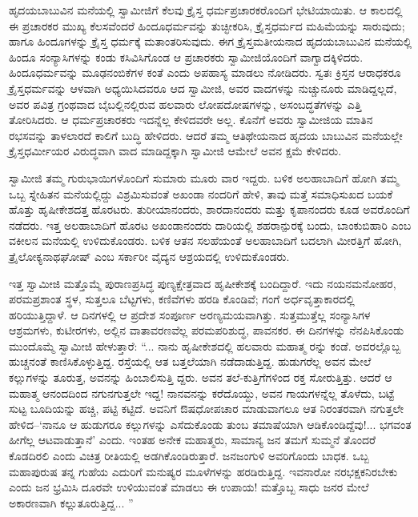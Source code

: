 ಹೃದಯಬಾಬುವಿನ ಮನೆಯಲ್ಲಿ ಸ್ವಾಮೀಜಿಗೆ ಕೆಲವು ಕ್ರೈಸ್ತ ಧರ್ಮಪ್ರಚಾರಕರೊಂದಿಗೆ ಭೇಟಿಯಾಯಿತು. ಆ ಕಾಲದಲ್ಲಿ ಈ ಪ್ರಚಾರಕರ ಮುಖ್ಯ ಕೆಲಸವೆಂದರೆ ಹಿಂದೂಧರ್ಮವನ್ನು ತುಚ್ಛೀಕರಿಸಿ, ಕ್ರೈಸ್ತಧರ್ಮದ ಮಹಿಮೆಯನ್ನು ಸಾರುವುದು; ಹಾಗೂ ಹಿಂದೂಗಳನ್ನು ಕ್ರೈಸ್ತ ಧರ್ಮಕ್ಕೆ ಮತಾಂತರಿಸುವುದು. ಈಗ ಕ್ರೈಸ್ತಮತೀಯನಾದ ಹೃದಯಬಾಬುವಿನ ಮನೆಯಲ್ಲಿ ಹಿಂದೂ ಸಂನ್ಯಾಸಿಗಳನ್ನು ಕಂಡು ಕಸಿವಿಸಿಗೊಂಡ ಆ ಪ್ರಚಾರಕರು ಸ್ವಾಮೀಜಿಯೊಂದಿಗೆ ವಾಗ್ವಾದಕ್ಕಿಳಿದರು. ಹಿಂದೂಧರ್ಮವನ್ನು ಮೂಢನಂಬಿಕೆಗಳ ಕಂತೆ ಎಂದು ಅಪಹಾಸ್ಯ ಮಾಡಲು ನೋಡಿದರು. ಸ್ವತಃ ಕ್ರಿಸ್ತನ ಆರಾಧಕರೂ ಕ್ರೈಸ್ತಧರ್ಮವನ್ನು ಆಳವಾಗಿ ಅಧ್ಯಯಿಸಿದವರೂ ಆದ ಸ್ವಾಮೀಜಿ, ಅವರ ವಾದಗಳನ್ನು ನುಚ್ಚುನೂರು ಮಾಡಿದ್ದಲ್ಲದೆ, ಅವರ ಪವಿತ್ರ ಗ್ರಂಥವಾದ ಬೈಬಲ್ಲಿನಲ್ಲಿರುವ ಹಲವಾರು ಲೋಪದೋಷಗಳನ್ನು, ಅಸಂಬದ್ಧತೆಗಳನ್ನು ಎತ್ತಿ ತೋರಿಸಿದರು. ಆ ಧರ್ಮಪ್ರಚಾರಕರು ಇದನ್ನೆಲ್ಲ ಕೇಳಿದವರೇ ಅಲ್ಲ. ಕೊನೆಗೆ ಅವರು ಸ್ವಾಮೀಜಿಯ ಮಾತಿನ ರಭಸವನ್ನು ತಾಳಲಾರದೆ ಕಾಲಿಗೆ ಬುದ್ಧಿ ಹೇಳಿದರು. ಆದರೆ ತಮ್ಮ ಆತಿಥೇಯನಾದ ಹೃದಯ ಬಾಬುವಿನ ಮನೆಯಲ್ಲೇ ಕ್ರೈಸ್ತಧರ್ಮೀಯರ ವಿರುದ್ಧವಾಗಿ ವಾದ ಮಾಡಿದ್ದಕ್ಕಾಗಿ ಸ್ವಾಮೀಜಿ ಆಮೇಲೆ ಅವನ ಕ್ಷಮೆ ಕೇಳಿದರು.

ಸ್ವಾಮೀಜಿ ತಮ್ಮ ಗುರುಭಾಯಿಗಳೊಂದಿಗೆ ಸುಮಾರು ಮೂರು ವಾರ ಇದ್ದರು. ಬಳಿಕ ಅಲಹಾಬಾದಿಗೆ ಹೋಗಿ ತಮ್ಮ ಒಬ್ಬ ಸ್ನೇಹಿತನ ಮನೆಯಲ್ಲಿದ್ದು ವಿಶ್ರಮಿಸುವಂತೆ ಅಖಂಡಾ ನಂದರಿಗೆ ಹೇಳಿ, ತಾವು ಮತ್ತೆ ಸಮಾಧಿಸುಖದ ಬಯಕೆ ಹೊತ್ತು ಹೃಷೀಕೇಶದತ್ತ ಹೊರಟರು. ತುರೀಯಾನಂದರು, ಶಾರದಾನಂದರು ಮತ್ತು ಕೃಪಾನಂದರು ಕೂಡ ಅವರೊಂದಿಗೆ ನಡೆದರು. ಇತ್ತ ಅಲಹಾಬಾದಿಗೆ ಹೊರಟ ಅಖಂಡಾನಂದರು ದಾರಿಯಲ್ಲಿ ಶಹರಾನ್ಪುರಕ್ಕೆ ಬಂದು, ಬಾಂಕುಬಿಹಾರಿ ಎಂಬ ವಕೀಲನ ಮನೆಯಲ್ಲಿ ಉಳಿದುಕೊಂಡರು. ಬಳಿಕ ಆತನ ಸಲಹೆಯಂತೆ ಅಲಹಾಬಾದಿಗೆ ಬದಲಾಗಿ ಮೀರತ್ತಿಗೆ ಹೋಗಿ, ತ್ರೈಲೋಕ್ಯನಾಥಘೋಷ್ ಎಂಬ ಸರ್ಕಾರೀ ವೈದ್ಯನ ಆಶ್ರಯದಲ್ಲಿ ಉಳಿದುಕೊಂಡರು.

ಇತ್ತ ಸ್ವಾಮೀಜಿ ಮತ್ತೊಮ್ಮೆ ಪುರಾಣಪ್ರಸಿದ್ಧ ಪುಣ್ಯಕ್ಷೇತ್ರವಾದ ಹೃಷೀಕೇಶಕ್ಕೆ ಬಂದಿದ್ದಾರೆ. ಇದು ನಯನಮನೋಹರ, ಪರಮಪ್ರಶಾಂತ ಸ್ಥಳ, ಸುತ್ತಲೂ ಬೆಟ್ಟಗಳು, ಕಣಿವೆಗಳು ಹರಡಿ ಕೊಂಡಿವೆ; ಗಂಗೆ ಅರ್ಧವೃತ್ತಾಕಾರದಲ್ಲಿ ಹರಿಯುತ್ತಿದ್ದಾಳೆ. ಆ ದಿನಗಳಲ್ಲಿ ಆ ಪ್ರದೇಶ ಸಂಪೂರ್ಣ ಅರಣ್ಯಮಯವಾಗಿತ್ತು. ಸುತ್ತಮುತ್ತೆಲ್ಲ ಸಂನ್ಯಾಸಿಗಳ ಆಶ್ರಮಗಳು, ಕುಟೀರಗಳು, ಅಲ್ಲಿನ ವಾತಾವರಣವೆಲ್ಲ ಪರಮಪರಿಶುದ್ಧ, ಪಾವನಕರ. ಈ ದಿನಗಳನ್ನು ನೆನಪಿಸಿಕೊಂಡು ಮುಂದೊಮ್ಮೆ ಸ್ವಾಮೀಜಿ ಹೇಳುತ್ತಾರೆ: “... ನಾನು ಹೃಷೀಕೇಶದಲ್ಲಿ ಹಲವಾರು ಮಹಾತ್ಮ ರನ್ನು ಕಂಡೆ. ಅವರಲ್ಲೊಬ್ಬ ಹುಚ್ಚನಂತೆ ಕಾಣಿಸಿಕೊಳ್ಳುತ್ತಿದ್ದ. ರಸ್ತೆಯಲ್ಲಿ ಆತ ಬತ್ತಲೆಯಾಗಿ ನಡೆದಾಡುತ್ತಿದ್ದ. ಹುಡುಗರೆಲ್ಲ ಅವನ ಮೇಲೆ ಕಲ್ಲುಗಳನ್ನು ತೂರುತ್ತ, ಅವನನ್ನು ಹಿಂಬಾಲಿಸುತ್ತಿ ದ್ದರು. ಅವನ ತಲೆ-ಕುತ್ತಿಗೆಗಳಿಂದ ರಕ್ತ ಸೋರುತ್ತಿತ್ತು. ಆದರೆ ಆ ಮಹಾತ್ಮ ಆನಂದದಿಂದ ನಗುನಗುತ್ತಲೇ ಇದ್ದ! ನಾನವನನ್ನು ಕರೆದೊಯ್ದು, ಅವನ ಗಾಯಗಳನ್ನೆಲ್ಲ ತೊಳೆದು, ಬಟ್ಟೆ ಸುಟ್ಟ ಬೂದಿಯನ್ನು ಹಚ್ಚಿ, ಪಟ್ಟಿ ಕಟ್ಟಿದೆ. ಅವನಿಗೆ ಔಷಧೋಪಚಾರ ಮಾಡುವಾಗಲೂ ಆತ ನಿರಂತರವಾಗಿ ನಗುತ್ತಲೇ ಹೇಳಿದ–‘ನಾನೂ ಆ ಹುಡುಗರೂ ಕಲ್ಲುಗಳನ್ನು ಎಸೆದುಕೊಂಡು ತುಂಬ ತಮಾಷೆಯಾಗಿ ಆಡಿಕೊಂಡಿದ್ದೆವು!... ಭಗವಂತ ಹೀಗೆಲ್ಲ ಆಟವಾಡುತ್ತಾನೆ’ ಎಂದು. ಇಂತಹ ಅನೇಕ ಮಹಾತ್ಮರು, ಸಾಮಾನ್ಯ ಜನ ತಮಗೆ ಸುಮ್ಮನೆ ತೊಂದರೆ ಕೊಡದಿರಲಿ ಎಂದು ವಿಚಿತ್ರ ರೀತಿಯಲ್ಲಿ ಅಡಗಿಕೊಂಡಿರುತ್ತಾರೆ. ಜನಜಂಗುಳಿ ಅವರಿಗೊಂದು ಬಾಧಕ. ಒಬ್ಬ ಮಹಾಪುರುಷ ತನ್ನ ಗುಹೆಯ ಎದುರಿಗೆ ಮನುಷ್ಯರ ಮೂಳೆಗಳನ್ನು ಹರಡಿರುತ್ತಿದ್ದ. ಇವನಾರೋ ನರಭಕ್ಷಕನಿರಬೇಕು ಎಂದು ಜನ ಭ್ರಮಿಸಿ ದೂರವೇ ಉಳಿಯುವಂತೆ ಮಾಡಲು ಈ ಉಪಾಯ! ಮತ್ತೊಬ್ಬ ಸಾಧು ಜನರ ಮೇಲೆ ಅಕಾರಣವಾಗಿ ಕಲ್ಲುತೂರುತ್ತಿದ್ದ... ”

